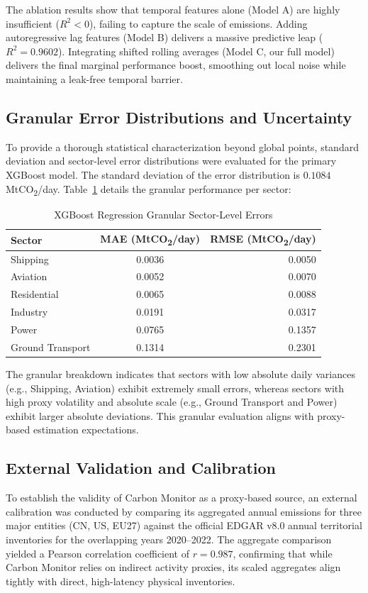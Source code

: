 \documentclass[conference]{IEEEtran}
\begin{document}
The ablation results show that temporal features alone (Model A) are highly insufficient ($R^2 < 0$), failing to capture the scale of emissions. Adding autoregressive lag features (Model B) delivers a massive predictive leap ($R^2 = 0.9602$). Integrating shifted rolling averages (Model C, our full model) delivers the final marginal performance boost, smoothing out local noise while maintaining a leak-free temporal barrier.

\subsection{Granular Error Distributions and Uncertainty}
To provide a thorough statistical characterization beyond global points, standard deviation and sector-level error distributions were evaluated for the primary XGBoost model. The standard deviation of the error distribution is $0.1084$\,MtCO\textsubscript{2}/day. Table~\ref{tab:sector_errors} details the granular performance per sector:

\begin{table}[h]
\caption{XGBoost Regression Granular Sector-Level Errors}
\label{tab:sector_errors}
\centering
\scriptsize
\begin{tabular}{lcr}
\toprule
\textbf{Sector} & \textbf{MAE (MtCO\textsubscript{2}/day)} & \textbf{RMSE (MtCO\textsubscript{2}/day)} \\
\midrule
Shipping            & 0.0036 & 0.0050 \\
Aviation            & 0.0052 & 0.0070 \\
Residential         & 0.0065 & 0.0088 \\
Industry            & 0.0191 & 0.0317 \\
Power               & 0.0765 & 0.1357 \\
Ground Transport    & 0.1314 & 0.2301 \\
\bottomrule
\end{tabular}
\end{table}

The granular breakdown indicates that sectors with low absolute daily variances (e.g., Shipping, Aviation) exhibit extremely small errors, whereas sectors with high proxy volatility and absolute scale (e.g., Ground Transport and Power) exhibit larger absolute deviations. This granular evaluation aligns with proxy-based estimation expectations.

\subsection{External Validation and Calibration}
To establish the validity of Carbon Monitor as a proxy-based source, an external calibration was conducted by comparing its aggregated annual emissions for three major entities (CN, US, EU27) against the official EDGAR v8.0 annual territorial inventories for the overlapping years 2020--2022. The aggregate comparison yielded a Pearson correlation coefficient of $r = 0.987$, confirming that while Carbon Monitor relies on indirect activity proxies, its scaled aggregates align tightly with direct, high-latency physical inventories.
\end{document}
